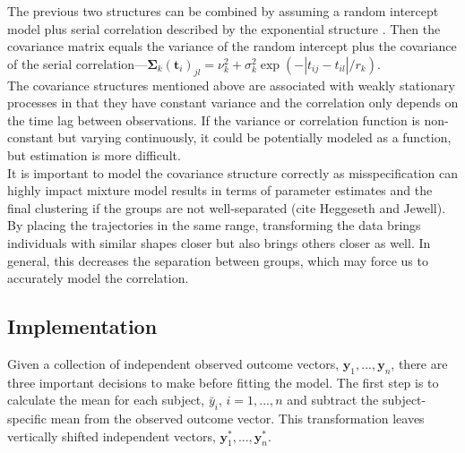 \documentclass[12pt]{article}
\newcommand{\B}[0]{\mathbf}
\begin{document}
The previous two structures can be combined by assuming a random intercept model plus serial correlation described by the exponential structure \cite{diggle2002}. Then the covariance matrix equals the variance of the random intercept plus the covariance of the serial correlation---$\B \Sigma_{k}(\B t_{i})_{jl}=\nu^{2}_{k}+\sigma_{k}^{2}\exp(-| t_{ij}-t_{il}| / r_{k})$.\\

The covariance structures mentioned above are associated with weakly stationary processes in that they have constant variance and the correlation only depends on the time lag between observations. If the variance or correlation function is non-constant but varying continuously, it could be potentially modeled as a function, but estimation is more difficult.\\

It is important to model the covariance structure correctly as misspecification can highly impact mixture model results in terms of parameter estimates and the final clustering if the groups are not well-separated (cite Heggeseth and Jewell). By placing the trajectories in the same range, transforming the data brings individuals with similar shapes closer but also brings others closer as well. In general, this decreases the separation between groups, which may force us to accurately model the correlation. 

\subsection{Implementation}
Given a collection of independent observed outcome vectors, $\B y_{1},...,\B y_{n}$, there are three important decisions to make before fitting the model. The first step is to calculate the mean for each subject, $\bar{y}_{i}$, $i=1,...,n$ and subtract the subject-specific mean from the observed outcome vector. This transformation leaves vertically shifted independent vectors, $\B y^{*}_{1},...,\B y^{*}_{n}$.  \\
\end{document}
